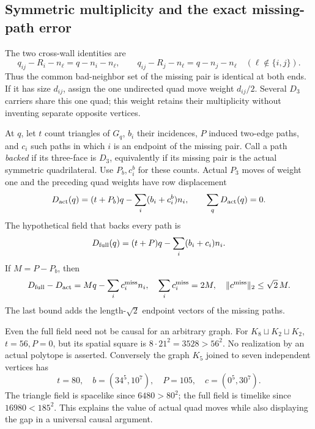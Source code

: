 \documentclass[11pt]{article}
\theoremstyle{definition}\newtheorem{definition}[theorem]{Definition}
\theoremstyle{remark}\newtheorem{remark}[theorem]{Remark}
\newcommand{\Pthree}{P_3}
\newcommand{\Dthree}{D_3}
\begin{document}
\subsection{Symmetric multiplicity and the exact missing-path error}
The two cross-wall identities are
\[
 q_{ij}-R_i-n_\ell=q-n_i-n_\ell,\qquad
 q_{ij}-R_j-n_\ell=q-n_j-n_\ell
 \quad(\ell\notin\{i,j\}).
\]
Thus the common bad-neighbor set of the missing pair is identical at
both ends. If it has size \(d_{ij}\), assign the one undirected quad
move weight \(d_{ij}/2\). Several \(\Dthree\) carriers share this
one quad; this weight retains their multiplicity without inventing
separate opposite vertices.

At \(q\), let \(t\) count triangles of \(G_q\), \(b_i\) their
incidences, \(P\) induced two-edge paths, and \(c_i\) such paths in
which \(i\) is an endpoint of the missing pair. Call a path
\emph{backed} if its three-face is \(\Dthree\), equivalently
if its missing pair is the actual symmetric quadrilateral. Use
\(P_b,c_i^b\) for these counts. Actual \(\Pthree\) moves of
weight one and the preceding quad weights have row displacement
\begin{equation}\label{eq:Dactual}
 D_{\rm act}(q)=(t+P_b)q-\sum_i(b_i+c_i^b)n_i,\qquad
 \sum_qD_{\rm act}(q)=0.
\end{equation}
The hypothetical field that backs every path is
\[
 D_{\rm full}(q)=(t+P)q-\sum_i(b_i+c_i)n_i.
\]
If \(M=P-P_b\), then
\begin{equation}\label{eq:error}
 D_{\rm full}-D_{\rm act}=Mq-\sum_i c_i^{\rm miss}n_i,\quad
 \sum_i c_i^{\rm miss}=2M,\quad
 \lVert c^{\rm miss}\rVert_2\le\sqrt2\,M.
\end{equation}
The last bound adds the length-\(\sqrt2\) endpoint vectors of the
missing paths.

Even the full field need not be causal for an arbitrary graph. For
\(K_8\sqcup K_2\sqcup K_2\), \(t=56,P=0\), but its spatial
square is \(8\cdot21^2=3528>56^2\).
No realization by an actual polytope is asserted. Conversely the
graph \(K_5\) joined to seven independent vertices has
\[
 t=80,\quad b=(34^5,10^7),\quad P=105,\quad c=(0^5,30^7).
\]
The triangle field is spacelike since \(6480>80^2\); the full
field is timelike since \(16980<185^2\).
This explains the value of actual quad moves while also displaying
the gap in a universal causal argument.
\end{document}
